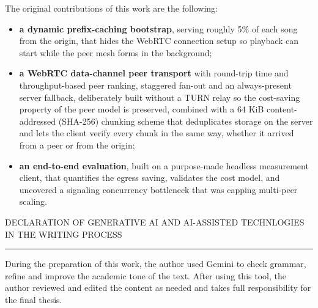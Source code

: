 \documentclass[12pt]{report}
\begin{document}
\vspace{1cm}
\par The original contributions of this work are the following:
\begin{itemize}
  \item \textbf{a dynamic prefix-caching bootstrap}, serving roughly 5\% of each song from the origin, that hides the WebRTC connection setup so playback can start while the peer mesh forms in the background;
  \item \textbf{a WebRTC data-channel peer transport} with round-trip time and throughput-based peer ranking, staggered fan-out and an always-present server fallback, deliberately built without a TURN relay so the cost-saving property of the peer model is preserved, combined with a 64 KiB content-addressed (SHA-256) chunking scheme that deduplicates storage on the server and lets the client verify every chunk in the same way, whether it arrived from a peer or from the origin;
  \item \textbf{an end-to-end evaluation}, built on a purpose-made headless measurement client, that quantifies the egress saving, validates the cost model, and uncovered a signaling concurrency bottleneck that was capping multi-peer scaling.
\end{itemize}


\vspace{1cm}
\markboth{}{}
DECLARATION OF GENERATIVE AI AND AI-ASSISTED TECHNLOGIES IN THE WRITING PROCESS
\vspace{0.5cm}
\hrule
\vspace{0.5cm}
\par During the preparation of this work, the author used Gemini to check grammar, refine and improve the academic tone of the text. After using this tool, the author reviewed and edited the content as needed and takes full responsibility for the final thesis.


\newpage
{}










\end{document}
